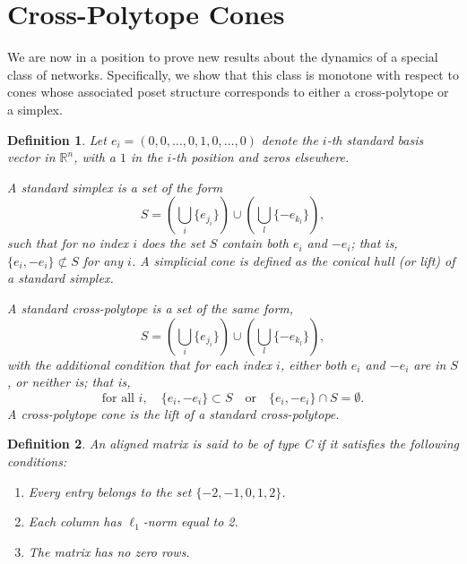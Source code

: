 \documentclass{article}
\newtheorem{define}{Definition}
\begin{document}
\section{Cross-Polytope Cones}
\label{sec:cross-polytopes cones}

We are now in a position to prove new results about the dynamics of a special class of networks. Specifically, we show that this class is monotone with respect to cones whose associated poset structure corresponds to either a cross-polytope or a simplex.



\begin{define}
    Let \( e_i = (0, 0, \dots, 0, 1, 0, \dots, 0) \) denote the \( i \)-th standard basis vector in \( \mathbb{R}^n \), with a \( 1 \) in the \( i \)-th position and zeros elsewhere.

    A \textit{standard simplex} is a set of the form
    \[
    S = \left( \bigcup_i \{ e_{j_i} \} \right) \cup \left( \bigcup_l \{ -e_{k_l} \} \right),
    \]
    such that for no index \( i \) does the set \( S \) contain both \( e_i \) and \( -e_i \); that is, \( \{ e_i, -e_i \} \not\subset S \) for any \( i \). A \textit{simplicial cone} is defined as the conical hull (or lift) of a standard simplex.

    A \textit{standard cross-polytope} is a set of the same form,
    \[
    S = \left( \bigcup_i \{ e_{j_i} \} \right) \cup \left( \bigcup_l \{ -e_{k_l} \} \right),
    \]
    with the additional condition that for each index \( i \), either both \( e_i \) and \( -e_i \) are in \( S \), or neither is; that is,
    \[
    \text{for all } i, \quad \{ e_i, -e_i \} \subset S \quad \text{or} \quad \{ e_i, -e_i \} \cap S = \emptyset.
    \]
    A \textit{cross-polytope cone} is the lift of a standard cross-polytope.
\end{define}





\begin{define}
    An aligned matrix is said to be of \textit{type C} if it satisfies the following conditions:
    \begin{enumerate}
        \item Every entry belongs to the set \(\{ -2, -1, 0, 1, 2 \}\).
        \item Each column has \( \ell_1 \)-norm equal to 2.
        \item The matrix has no zero rows.
    \end{enumerate}
\end{define}
\end{document}
